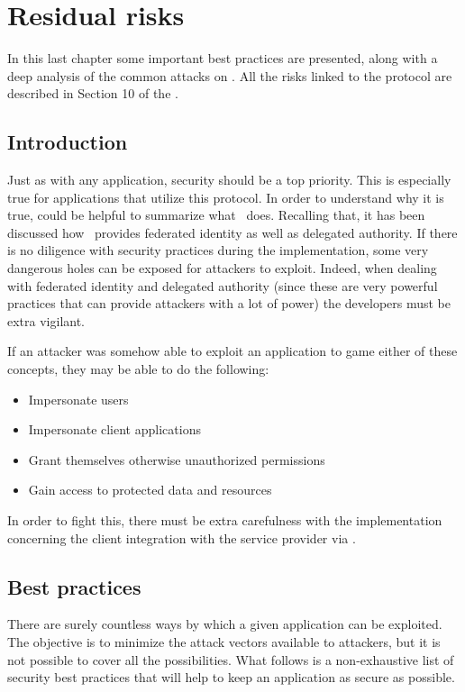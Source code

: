
\chapter{Residual risks}
In this last chapter some important best practices are presented, along with a deep analysis of the common attacks on \textit{\oauth}. All the risks linked to the protocol are described in Section 10 of the  \cite{RFC6749}.


\section{Introduction}
Just as with any application, security should be a top priority. This is especially true for applications that utilize this protocol. In order to understand why it is true, could be helpful to summarize what \oauth\ does. Recalling that, it has been discussed how \oauth\ provides federated identity as well as delegated authority. If there is no diligence with security practices during the implementation, some very dangerous holes can be exposed for attackers to exploit.
Indeed, when dealing with federated identity and delegated authority (since these are very powerful practices that can provide attackers with a lot of power) the developers must be extra vigilant.

If an attacker was somehow able to exploit an application to game either of these concepts, they may be able to do the following:

\begin{itemize}
    \item Impersonate users
    \item Impersonate client applications
    \item Grant themselves otherwise unauthorized permissions
    \item Gain access to protected data and resources
\end{itemize}

In order to fight this, there must be extra carefulness with the implementation concerning the client integration with the service provider via \oauth. 

\section{Best practices}
There are surely countless ways by which a given application can be exploited. The objective is to minimize the attack vectors available to attackers, but it is not possible to cover all the possibilities. What follows is a non-exhaustive list of security best practices that will help to keep an application as secure as possible. 

